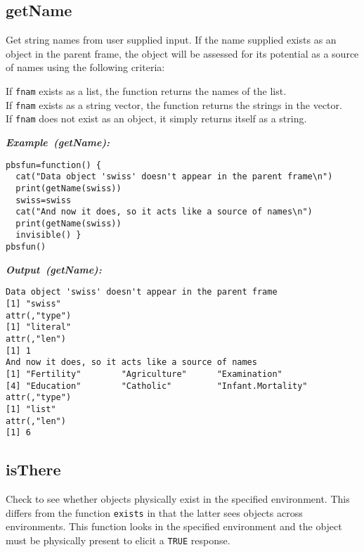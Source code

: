 \documentclass[letterpaper,12pt,fleqn]{article}
\def\tab{\hspace{0.5 in}}
\newcommand{\code}[1]{\small\texttt{#1}\normalsize}
\newcommand\example[1]{    %
	\textbf{\emph{Example~(#1):}}\\ \vspace{3 pt}
}
\newcommand\results[1]{    %
	\textbf{\emph{Output~(#1):}}\\ \vspace{3 pt}
}
\begin{document}
\subsection {getName}

\tab Get string names from user supplied input. If the name supplied exists as an object in the parent frame, the object will be assessed for its potential as a source of names using the following criteria:

If \code{fnam} exists as a list, the function returns the names of the list.\\
If \code{fnam} exists as a string vector, the function returns the strings in the vector.\\
If \code{fnam} does not exist as an object, it simply returns itself as a string.

\begin{examplebox}
\example{getName}
\begin{Verbatim}[fontsize=\footnotesize]
pbsfun=function() {
  cat("Data object 'swiss' doesn't appear in the parent frame\n")
  print(getName(swiss))
  swiss=swiss
  cat("And now it does, so it acts like a source of names\n")
  print(getName(swiss))
  invisible() }
pbsfun()
\end{Verbatim}
\end{examplebox}

\begin{outputbox}
\results{getName}
\begin{Verbatim}[fontsize=\footnotesize]
Data object 'swiss' doesn't appear in the parent frame
[1] "swiss"
attr(,"type")
[1] "literal"
attr(,"len")
[1] 1
And now it does, so it acts like a source of names
[1] "Fertility"        "Agriculture"      "Examination"     
[4] "Education"        "Catholic"         "Infant.Mortality"
attr(,"type")
[1] "list"
attr(,"len")
[1] 6
\end{Verbatim}
\end{outputbox}

\subsection {isThere}

\tab Check to see whether objects physically exist in the specified environment. This differs from the function \code{exists} in that the latter sees objects across environments.  This function looks in the specified environment and the object must be physically present to elicit a \code{TRUE} response.
\end{document}

